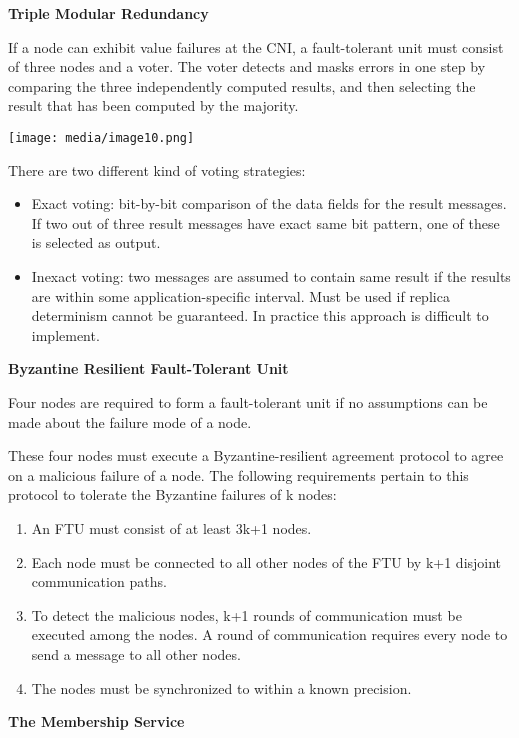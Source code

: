 \textbf{Triple Modular Redundancy}

If a node can exhibit value failures at the CNI, a fault-tolerant unit
must consist of three nodes and a voter. The voter detects and masks
errors in one step by comparing the three independently computed
results, and then selecting the result that has been computed by the
majority.

\texttt{[image: media/image10.png]}

There are two different kind of voting strategies:

\begin{itemize}
\item
  Exact voting: bit-by-bit comparison of the data fields for the result
  messages. If two out of three result messages have exact same bit
  pattern, one of these is selected as output.
\item
  Inexact voting: two messages are assumed to contain same result if the
  results are within some application-specific interval. Must be used if
  replica determinism cannot be guaranteed. In practice this approach is
  difficult to implement.
\end{itemize}

\textbf{Byzantine Resilient Fault-Tolerant Unit}

Four nodes are required to form a fault-tolerant unit if no assumptions
can be made about the failure mode of a node.

These four nodes must execute a Byzantine-resilient agreement protocol
to agree on a malicious failure of a node. The following requirements
pertain to this protocol to tolerate the Byzantine failures of k nodes:

\begin{enumerate}
\def\labelenumi{\arabic{enumi}.}
\item
  An FTU must consist of at least 3k+1 nodes.
\item
  Each node must be connected to all other nodes of the FTU by k+1
  disjoint communication paths.
\item
  To detect the malicious nodes, k+1 rounds of communication must be
  executed among the nodes. A round of communication requires every node
  to send a message to all other nodes.
\item
  The nodes must be synchronized to within a known precision.
\end{enumerate}

\textbf{The Membership Service}

